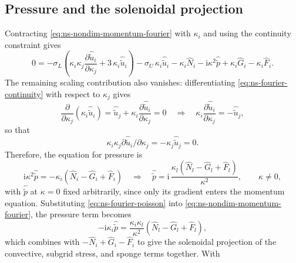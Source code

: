 \documentclass{article}
\begin{document}
\subsection{Pressure and the solenoidal projection}\label{ssec:ns-projection}
Contracting \eqref{eq:ns-nondim-momentum-fourier} with $\kappa_i$ and using the
continuity constraint gives
\begin{equation}\label{eq:ns-pressure-contracted}
  0 = -\sigma_L \left( \kappa_i \kappa_j \frac{\partial \hat{\tilde u}_i}{\partial \kappa_j} + 3\, \kappa_i \hat{\tilde u}_i \right)
  - \sigma_U\, \kappa_i \hat{\tilde u}_i
  - \kappa_i \hat{N}_i
  - \mathrm{i} \kappa^2 \hat{\tilde p}
  + \kappa_i \hat{G}_i
  - \kappa_i \hat{F}_i.
\end{equation}
The remaining scaling contribution also vanishes: differentiating
\eqref{eq:ns-fourier-continuity} with respect to $\kappa_j$ gives
\begin{equation}\label{eq:ns-continuity-dk}
  \frac{\partial}{\partial \kappa_j}\left( \kappa_i \hat{\tilde u}_i \right)
  = \hat{\tilde u}_j + \kappa_i \frac{\partial \hat{\tilde u}_i}{\partial \kappa_j} = 0
  \quad\Longrightarrow\quad
  \kappa_i \frac{\partial \hat{\tilde u}_i}{\partial \kappa_j} = -\hat{\tilde u}_j,
\end{equation}
so that
\begin{equation}
  \kappa_i \kappa_j \partial \hat{\tilde u}_i / \partial \kappa_j = -\kappa_j \hat{\tilde u}_j = 0.
\end{equation}
Therefore, the equation for pressure is
\begin{equation}\label{eq:ns-fourier-poisson}
  \mathrm{i} \kappa^2 \hat{\tilde p} = -\kappa_i \left( \hat{N}_i - \hat{G}_i + \hat{F}_i \right)
  \quad\Longrightarrow\quad
  \hat{\tilde p} = \mathrm{i}\,\frac{\kappa_l \left( \hat{N}_l - \hat{G}_l + \hat{F}_l \right)}{\kappa^2},
  \qquad \kappa \neq 0,
\end{equation}
with $\hat{\tilde p}$ at $\kappa = 0$ fixed arbitrarily, since only its gradient enters
the momentum equation. Substituting \eqref{eq:ns-fourier-poisson} into
\eqref{eq:ns-nondim-momentum-fourier}, the pressure term becomes
\begin{equation}\label{eq:ns-fourier-pressure-substituted}
  -\mathrm{i} \kappa_i \hat{\tilde p} = \frac{\kappa_i \kappa_l}{\kappa^2} \left( \hat{N}_l - \hat{G}_l + \hat{F}_l \right),
\end{equation}
which combines with $-\hat{N}_i + \hat{G}_i - \hat{F}_i$ to give the solenoidal
projection of the convective, subgrid stress, and sponge terms together. With
\end{document}
